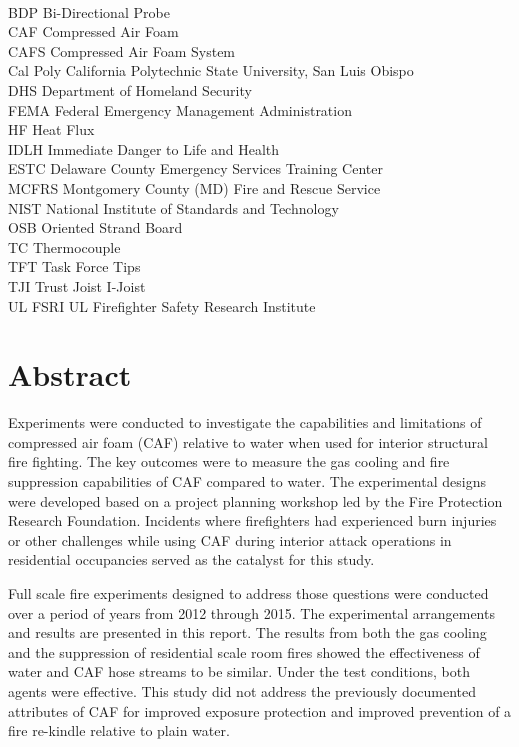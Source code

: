 \documentclass[12pt,oneside]{book}
\begin{document}
\begin{tabbing}
\hspace{1.5in} \= \\
BDP \> Bi-Directional Probe \\
CAF \> Compressed Air Foam \\
CAFS \> Compressed Air Foam System \\
Cal Poly \> California Polytechnic State University, San Luis Obispo \\
DHS \> Department of Homeland Security \\
FEMA \> Federal Emergency Management Administration \\
HF \> Heat Flux \\
IDLH \> Immediate Danger to Life and Health \\
ESTC \> Delaware County Emergency Services Training Center \\
MCFRS \> Montgomery County (MD) Fire and Rescue Service \\
NIST \> National Institute of Standards and Technology \\
OSB \> Oriented Strand Board \\
TC \> Thermocouple \\
TFT \> Task Force Tips \\
TJI \> Trust Joist I-Joist \\
UL FSRI \> UL Firefighter Safety Research Institute \\

\end{tabbing}

\mainmatter

\chapter*{\centering Abstract}

Experiments were conducted to investigate the capabilities and limitations of compressed air foam (CAF) relative to water when used for interior structural fire fighting. The key outcomes were to measure the gas cooling and fire suppression capabilities of CAF compared to water. The experimental designs were developed based on a project planning workshop led by the Fire Protection Research Foundation. Incidents where firefighters had experienced burn injuries or other challenges while using CAF during interior attack operations in residential occupancies served as the catalyst for this study.

Full scale fire experiments designed to address those questions were conducted over a period of years from 2012 through 2015. The experimental arrangements and results are presented in this report. The results from both the gas cooling and the suppression of residential scale room fires showed the effectiveness of water and CAF hose streams to be similar. Under the test conditions, both agents were effective. This study did not address the previously documented attributes of CAF for improved exposure protection and improved prevention of a fire re-kindle relative to plain water. 
\end{document}

